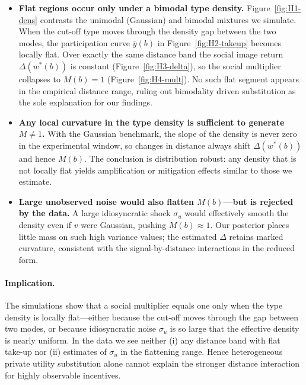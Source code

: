 \documentclass[12pt,a4paper]{article}
\begin{document}
\begin{itemize}
  \item \textbf{Flat regions occur only under a bimodal type density.}  
  Figure~\ref{fig:H1-dens} contrasts the unimodal (Gaussian) and bimodal mixtures we simulate.  When the cut‑off type moves through the density gap between the two modes, the participation curve $\bar y(b)$ in Figure~\ref{fig:H2-takeup} becomes locally flat.  Over exactly the same distance band the social image return $\Delta(w^{\ast}(b))$ is constant (Figure~\ref{fig:H3-delta}), so the social multiplier collapses to $M(b)=1$ (Figure~\ref{fig:H4-mult}). No such flat segment appears in the empirical distance range, ruling out bimodality driven substitution as the sole explanation for our findings.

  \item \textbf{Any local curvature in the type density is sufficient to generate $M\neq1$.}  With the Gaussian benchmark, the slope of the density is never zero in the experimental window, so changes in distance always shift $\Delta(w^{\ast}(b))$ and hence $M(b)$.  The conclusion is distribution robust: any density that is not locally flat yields amplification or mitigation effects similar to those we estimate.

  \item \textbf{Large unobserved noise would also flatten $M(b)$—but is rejected by the data.}  
  A large idiosyncratic shock $\sigma_u$ would effectively smooth the density even if $v$ were Gaussian, pushing $M(b)\approx1$.  Our posterior places little mass on such high variance values; the estimated $\Delta$ retains marked curvature, consistent with the signal-by-distance interactions in the reduced form.
\end{itemize}

\paragraph{Implication.}
The simulations show that a social multiplier equals one only when the type density is locally flat—either because the cut‑off moves through the gap between two modes, or because idiosyncratic noise \(\sigma_u\) is so large that the effective density is nearly uniform.  In the data we see neither (i) any distance band with flat take‑up nor (ii) estimates of \(\sigma_u\) in the flattening range.  Hence heterogeneous private utility substitution alone cannot explain the stronger distance interaction for highly observable incentives.\\
\end{document}
